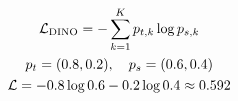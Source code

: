 \documentclass[border=7pt]{standalone}
\begin{document}
\color{ink}
$\displaystyle \begin{gathered}
\mathcal L_{\rm DINO}=-\sum_{k=1}^{K}p_{t,k}\log p_{s,k}\\
p_t=(0.8,0.2),\quad p_s=(0.6,0.4)\\
\mathcal L=-0.8\log0.6-0.2\log0.4\approx0.592
\end{gathered}$
\end{document}
